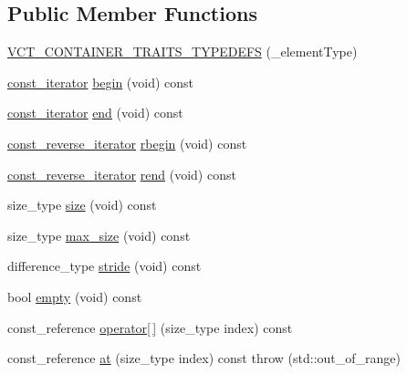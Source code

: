 \subsection*{Public Member Functions}
\begin{DoxyCompactItemize}
\item 
\hyperlink{classvct_fixed_size_const_vector_base_aa58a77c3e1e45a50d7677d9a8fbb5f17}{V\-C\-T\-\_\-\-C\-O\-N\-T\-A\-I\-N\-E\-R\-\_\-\-T\-R\-A\-I\-T\-S\-\_\-\-T\-Y\-P\-E\-D\-E\-F\-S} (\-\_\-element\-Type)
\item 
\hyperlink{classvct_fixed_size_const_vector_base_abc547e0542bb6f7d92876a56c7ea5cdc}{const\-\_\-iterator} \hyperlink{classvct_fixed_size_const_vector_base_a78e79d048c2a069fa331a10c7c497806}{begin} (void) const 
\item 
\hyperlink{classvct_fixed_size_const_vector_base_abc547e0542bb6f7d92876a56c7ea5cdc}{const\-\_\-iterator} \hyperlink{classvct_fixed_size_const_vector_base_a304e1ab5b8fc2627cf8544d1acc3ba36}{end} (void) const 
\item 
\hyperlink{classvct_fixed_size_const_vector_base_acd0a5fe64ff3551c45cebfb2ba81cf10}{const\-\_\-reverse\-\_\-iterator} \hyperlink{classvct_fixed_size_const_vector_base_a619ec380da3061d80e856f28fe2b2964}{rbegin} (void) const 
\item 
\hyperlink{classvct_fixed_size_const_vector_base_acd0a5fe64ff3551c45cebfb2ba81cf10}{const\-\_\-reverse\-\_\-iterator} \hyperlink{classvct_fixed_size_const_vector_base_acd691bb22ac1ca5abf578be37273fb5d}{rend} (void) const 
\item 
size\-\_\-type \hyperlink{classvct_fixed_size_const_vector_base_a05beb10f53809905f4db11b0b5b6f651}{size} (void) const 
\item 
size\-\_\-type \hyperlink{classvct_fixed_size_const_vector_base_a50473c70f34bcab8e01ba2eaeef69813}{max\-\_\-size} (void) const 
\item 
difference\-\_\-type \hyperlink{classvct_fixed_size_const_vector_base_ac1cbc7509e0cc11b011acc63f2584331}{stride} (void) const 
\item 
bool \hyperlink{classvct_fixed_size_const_vector_base_aed78a0e4e2c5119bfb92d53bedb572e2}{empty} (void) const 
\item 
const\-\_\-reference \hyperlink{classvct_fixed_size_const_vector_base_a54c324bad074d2c2ca7bfadcda0eba3d}{operator\mbox{[}$\,$\mbox{]}} (size\-\_\-type index) const 
\item 
const\-\_\-reference \hyperlink{classvct_fixed_size_const_vector_base_ae5a13bd07071fd5338c87d13ba385b33}{at} (size\-\_\-type index) const   throw (std\-::out\-\_\-of\-\_\-range)

\end{DoxyCompactItemize}
